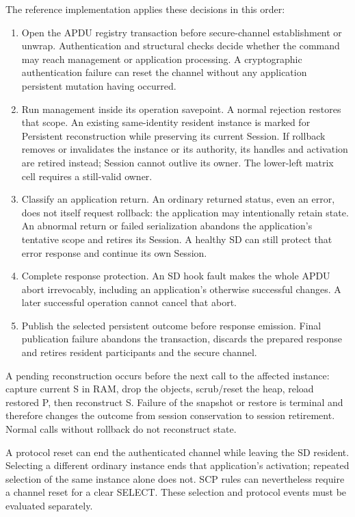 The reference implementation applies these decisions in this order:
\begin{enumerate}
\item Open the APDU registry transaction before secure-channel establishment
  or unwrap. Authentication and structural checks decide whether the
  command may reach management or application processing. A cryptographic
  authentication failure can reset the channel without any application
  persistent mutation having occurred.
\item Run management inside its operation savepoint. A normal rejection
  restores that scope. An existing same-identity resident instance is marked
  for Persistent reconstruction while preserving its current Session.
  If rollback removes or invalidates the instance or its authority, its
  handles and activation are retired instead; Session cannot outlive its
  owner. The lower-left matrix cell requires a still-valid owner.
\item Classify an application return. An ordinary returned status, even an
  error, does not itself request rollback: the application may intentionally
  retain state. An abnormal return or failed serialization abandons the
  application's tentative scope and retires its Session. A healthy SD can
  still protect that error response and continue its own Session.
\item Complete response protection. An SD hook fault makes the whole APDU
  abort irrevocably, including an application's otherwise successful changes.
  A later successful operation cannot cancel that abort.
\item Publish the selected persistent outcome before response emission.
  Final publication failure abandons the transaction, discards the prepared
  response and retires resident participants and the secure channel.
\end{enumerate}

A pending reconstruction occurs before the next call to the affected
instance: capture current S in RAM, drop the objects, scrub/reset the heap,
reload restored P, then reconstruct S. Failure of the snapshot or restore
is terminal and therefore changes the outcome from session conservation to
session retirement. Normal calls without rollback do not reconstruct state.

A protocol reset can end the authenticated channel while leaving the SD
resident. Selecting a different ordinary instance ends that application's
activation; repeated selection of the same instance alone does not. SCP
rules can nevertheless require a channel reset for a clear SELECT. These
selection and protocol events must be evaluated separately.

